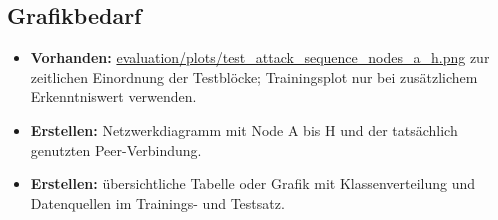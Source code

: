 \subsection{Grafikbedarf}
\begin{itemize}
  \item \textbf{Vorhanden:} \url{evaluation/plots/test_attack_sequence_nodes_a_h.png}
        zur zeitlichen Einordnung der Testblöcke; Trainingsplot nur bei
        zusätzlichem Erkenntniswert verwenden.
  \item \textbf{Erstellen:} Netzwerkdiagramm mit Node A bis H und der
        tatsächlich genutzten Peer-Verbindung.
  \item \textbf{Erstellen:} übersichtliche Tabelle oder Grafik mit
        Klassenverteilung und Datenquellen im Trainings- und Testsatz.
\end{itemize}
